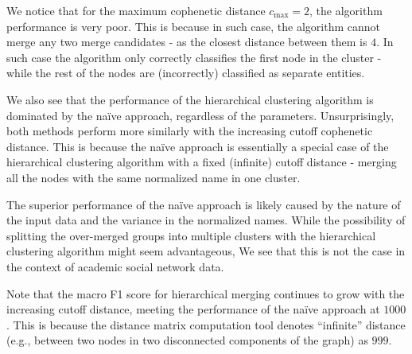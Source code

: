 
We notice that for the maximum cophenetic distance $c_{\text{max}} = 2$, the algorithm performance is very poor.
This is because in such case, the algorithm cannot merge any two merge candidates - as the closest distance between them is $4$.
In such case the algorithm only correctly classifies the first node in the cluster - while the rest of the nodes are (incorrectly) classified as separate entities.

We also see that the performance of the hierarchical clustering algorithm is dominated by the naïve approach, regardless of the parameters.
Unsurprisingly, both methods perform more similarly with the increasing cutoff cophenetic distance. 
This is because the naïve approach is essentially a special case of the hierarchical clustering algorithm with a fixed (infinite) cutoff distance
 - merging all the nodes with the same normalized name in one cluster.

 The superior performance of the naïve approach is likely caused by the nature of the input data and the variance in the normalized names.
 While the possibility of splitting the over-merged groups into multiple clusters with the hierarchical clustering algorithm might seem advantageous,
 We see that this is not the case in the context of academic social network data.

 Note that the macro F1 score for hierarchical merging continues to grow with the increasing cutoff distance, 
 meeting the performance of the naïve approach at $1000$. This is because the distance matrix computation tool 
 denotes “infinite” distance (e.g., between two nodes in two disconnected components of the graph) as $999$.
